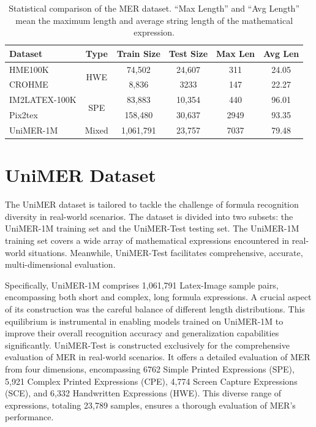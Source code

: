 \documentclass[runningheads]{llncs}
\begin{document}
 \begin{table}[t]
    \renewcommand\arraystretch{0.5}
    \centering
    \caption{Statistical comparison of the MER dataset. ``Max Length'' and ``Avg Length'' mean the maximum length and average string length of the mathematical expression.}
    \label{tab:tab1_statistic}
    \begin{tabular}{l|c|c|c|c|c}%
    \toprule[1.0pt] 
    \textbf{Dataset}   & \textbf{ Type }& \textbf{ Train Size }&  \textbf{ Test Size } & \textbf{ Max Len } & \textbf{ Avg Len }  \\ \midrule[1pt]
    HME100K  & \multirow{2}{*}{HWE}         & 74,502    & 24,607    & 311  & 24.05  \\
    CROHME         &                        & 8,836     & 3233      & 147  & 22.27  \\  \midrule[0.5pt]
    IM2LATEX-100K  & \multirow{2}{*}{SPE}   & 83,883    & 10,354    & 440  & 96.01  \\  
    Pix2tex        &                        & 158,480   & 30,637    & 2949 & 93.35 \\  \midrule[0.5pt]
    UniMER-1M     & Mixed                  & 1,061,791 & 23,757    & 7037 & 79.48  \\
    \bottomrule[1.0pt]
    \end{tabular}
    \vspace{-5pt}
\end{table}


\section{UniMER Dataset}

The UniMER dataset is tailored to tackle the challenge of formula recognition diversity in real-world scenarios.
The dataset is divided into two subsets: the UniMER-1M training set and the UniMER-Test testing set.
The UniMER-1M training set covers a wide array of mathematical expressions encountered in real-world situations.
Meanwhile, UniMER-Test facilitates comprehensive, accurate, multi-dimensional evaluation. 


Specifically, UniMER-1M comprises 1,061,791 Latex-Image sample pairs, encompassing both short and complex, long formula expressions. 
A crucial aspect of its construction was the careful balance of different length distributions.
This equilibrium is instrumental in enabling models trained on UniMER-1M to improve their overall recognition accuracy and generalization capabilities significantly.
UniMER-Test is constructed exclusively for the comprehensive evaluation of MER in real-world scenarios. It offers a detailed evaluation of MER from four dimensions, encompassing 6762 Simple Printed Expressions (SPE), 5,921 Complex Printed Expressions (CPE), 4,774 Screen Capture Expressions (SCE), and 6,332 Handwritten Expressions (HWE). This diverse range of expressions, totaling 23,789 samples, ensures a thorough evaluation of MER's performance.
\end{document}
